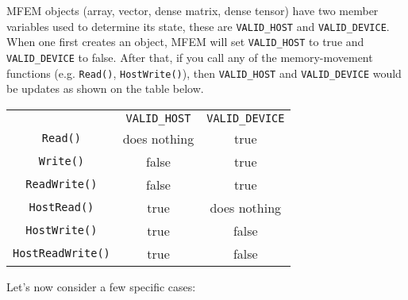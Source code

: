 \documentclass[a4paper,11pt]{article}
\begin{document}
MFEM objects (array, vector, dense matrix, dense tensor) have two member variables used to determine its state, these are \texttt{VALID\_HOST} and \texttt{VALID\_DEVICE}. When one first creates an object, MFEM will set \texttt{VALID\_HOST} to true and \texttt{VALID\_DEVICE} to false. After that, if you call any of the memory-movement functions (e.g. \texttt{Read()}, \texttt{HostWrite()}), then \texttt{VALID\_HOST} and \texttt{VALID\_DEVICE} would be updates as shown on the table below.
\begin{center}
    \begin{tabular}{c | c | c}
        & \texttt{VALID\_HOST} & \texttt{VALID\_DEVICE} \\
        \hhline{=|=|=}
        \texttt{Read()} & does nothing & true \\ 
        \texttt{Write()} & false & true \\
        \texttt{ReadWrite()} & false & true \\
        \texttt{HostRead()} & true & does nothing \\ 
        \texttt{HostWrite()} & true & false \\
        \texttt{HostReadWrite()} & true & false \\
    \end{tabular}
\end{center}
Let's now consider a few specific cases:
\end{document}
